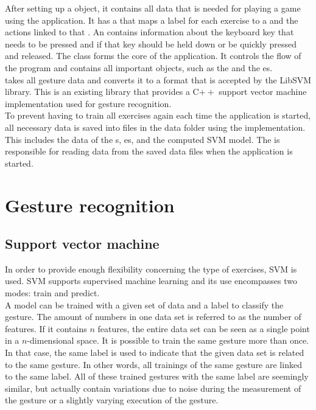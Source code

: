 After setting up a  object, it contains all data that is needed for playing a game using the application. It has a  that maps a label for each exercise to a  and the actions linked to that . An  contains information about the keyboard key that needs to be pressed and if that key should be held down or be quickly pressed and released. The  class forms the core of the application. It controls the flow of the program and contains all important objects, such as the  and the es.\\

 takes all gesture data and converts it to a format that is accepted by the LibSVM library. This is an existing library that provides a C$++$ support vector machine implementation used for gesture recognition.\\

To prevent having to train all exercises again each time the application is started, all necessary data is saved into files in the data folder using the  implementation. This includes the data of the s, es,  and the computed SVM model. The  is responsible for reading data from the saved data files when the application is started.


\section{Gesture recognition}

\subsection{Support vector machine}

In order to provide enough flexibility concerning the type of exercises, SVM is used. SVM supports supervised machine learning and its use encompasses two modes: train and predict.\\

A model can be trained with a given set of data and a label to classify the gesture. The amount of numbers in one data set is referred to as the number of features. If it contains $n$ features, the entire data set can be seen as a single point in a $n$-dimensional space. It is possible to train the same gesture more than once. In that case, the same label is used to indicate that the given data set is related to the same gesture. In other words, all trainings of the same gesture are linked to the same label. All of these trained gestures with the same label are seemingly similar, but actually contain variations due to noise during the measurement of the gesture or a slightly varying execution of the gesture.\\

